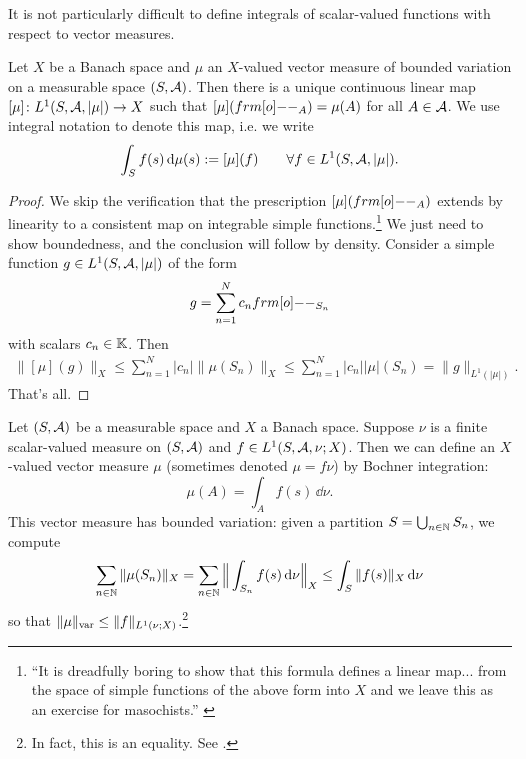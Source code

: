 It is not particularly difficult to define integrals of scalar-valued functions with respect to vector measures.

\begin{prop}
  Let $X$ be a Banach space and $\mu$ an $X$-valued vector measure of bounded variation on a measurable space $(S,\mathcal{A})$.
  Then there is a unique continuous linear map $[\mu] \colon L^1(S,\mathcal{A},|\mu|) \rightarrow X$ such that $[\mu](\1_{A}) = \mu(A)$ for all $A \in \mathcal{A}$.
  We use integral notation to denote this map, i.e. we write
  \begin{equation*}
    \int_{S} f(s) \, \mathrm{d}\mu(s) := [\mu](f) \qquad \forall f \in L^1(S,\mathcal{A},|\mu|).
  \end{equation*}
\end{prop}

\begin{proof}
  We skip the verification that the prescription $[\mu](\1_{A})$ extends by linearity to a consistent map on integrable simple functions.\footnote{``It is dreadfully boring to show that this formula defines a linear map... from the space of simple functions of the above form into $X$ and we leave this as an exercise for masochists.'' \cite[pp5-6]{DU77}}
  We just need to show boundedness, and the conclusion will follow by density.
  Consider a simple function $g \in L^1(S,\mathcal{A},|\mu|)$ of the form
  \begin{equation*}
    g = \sum_{n=1}^{N} c_n \1_{S_n} 
  \end{equation*}
  with scalars $c_n \in \mathbb{K}$.
  Then
  \begin{equation*}
    \begin{aligned}
      \|[\mu](g)\|_X \leq \sum_{n=1}^{N} |c_n| \|\mu(S_n)\|_X \leq \sum_{n=1}^{N} |c_n| |\mu|(S_n) = \|g\|_{L^1(|\mu|)}.
    \end{aligned}
  \end{equation*}
  That's all.
\end{proof}


\begin{example}\label{eg:RN-density}
  Let $(S,\mathcal{A})$ be a measurable space and $X$ a Banach space.
  Suppose $\nu$ is a finite scalar-valued measure on $(S,\mathcal{A})$ and $f \in L^1(S,\mathcal{A},\nu;X)$.
  Then we can define an $X$-valued vector measure $\mu$ (sometimes denoted $\mu = f\nu$) by Bochner integration:
  \begin{equation*}
    \mu(A) = \int_A f(s) \, \dd\nu.
  \end{equation*}
  This vector measure has bounded variation: given a partition $S = \bigcup_{n \in \mathbb{N}} S_n$, we compute
  \begin{equation*}
    \sum_{n \in \mathbb{N}} \|\mu(S_n)\|_{X} = \sum_{n \in \mathbb{N}} \Big\| \int_{S_n} f(s) \, \mathrm{d}\nu \Big\|_X
    \leq \int_{S} \|f(s)\|_{X} \, \mathrm{d}\nu
  \end{equation*}
  so that $\|\mu\|_{\mathrm{var}} \leq \|f\|_{L^1(\nu;X)}$.\footnote{In fact, this is an equality. See \cite[pp43]{gP16}.}
\end{example}

